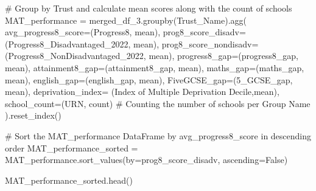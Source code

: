 \documentclass[
  letterpaper,
  DIV=11,
  numbers=noendperiod]{scrartcl}
\newenvironment{Shaded}{\begin{snugshade}}{\end{snugshade}}
\newcommand{\CommentTok}[1]{\textcolor[rgb]{0.37,0.37,0.37}{#1}}
\newcommand{\NormalTok}[1]{\textcolor[rgb]{0.00,0.23,0.31}{#1}}
\newcommand{\OperatorTok}[1]{\textcolor[rgb]{0.37,0.37,0.37}{#1}}
\newcommand{\StringTok}[1]{\textcolor[rgb]{0.13,0.47,0.30}{#1}}
\newcommand{\VariableTok}[1]{\textcolor[rgb]{0.07,0.07,0.07}{#1}}
\begin{document}
\begin{Shaded}
\begin{Highlighting}[]
\CommentTok{\# Group by Trust and calculate mean scores along with the count of schools}
\NormalTok{MAT\_performance }\OperatorTok{=}\NormalTok{ merged\_df\_3.groupby(}\StringTok{\textquotesingle{}Trust\_Name\textquotesingle{}}\NormalTok{).agg(}
\NormalTok{    avg\_progress8\_score}\OperatorTok{=}\NormalTok{(}\StringTok{\textquotesingle{}Progress8\textquotesingle{}}\NormalTok{, }\StringTok{\textquotesingle{}mean\textquotesingle{}}\NormalTok{),}
\NormalTok{    prog8\_score\_disadv}\OperatorTok{=}\NormalTok{(}\StringTok{\textquotesingle{}Progress8\_Disadvantaged\_2022\textquotesingle{}}\NormalTok{, }\StringTok{\textquotesingle{}mean\textquotesingle{}}\NormalTok{),}
\NormalTok{    prog8\_score\_nondisadv}\OperatorTok{=}\NormalTok{(}\StringTok{\textquotesingle{}Progress8\_NonDisadvantaged\_2022\textquotesingle{}}\NormalTok{, }\StringTok{\textquotesingle{}mean\textquotesingle{}}\NormalTok{),}
\NormalTok{    progress8\_gap}\OperatorTok{=}\NormalTok{(}\StringTok{\textquotesingle{}progress8\_gap\textquotesingle{}}\NormalTok{, }\StringTok{\textquotesingle{}mean\textquotesingle{}}\NormalTok{),}
\NormalTok{    attainment8\_gap}\OperatorTok{=}\NormalTok{(}\StringTok{\textquotesingle{}attainment8\_gap\textquotesingle{}}\NormalTok{, }\StringTok{\textquotesingle{}mean\textquotesingle{}}\NormalTok{),}
\NormalTok{    maths\_gap}\OperatorTok{=}\NormalTok{(}\StringTok{\textquotesingle{}maths\_gap\textquotesingle{}}\NormalTok{, }\StringTok{\textquotesingle{}mean\textquotesingle{}}\NormalTok{),}
\NormalTok{    english\_gap}\OperatorTok{=}\NormalTok{(}\StringTok{\textquotesingle{}english\_gap\textquotesingle{}}\NormalTok{, }\StringTok{\textquotesingle{}mean\textquotesingle{}}\NormalTok{),}
\NormalTok{    FiveGCSE\_gap}\OperatorTok{=}\NormalTok{(}\StringTok{\textquotesingle{}5\_GCSE\_gap\textquotesingle{}}\NormalTok{, }\StringTok{\textquotesingle{}mean\textquotesingle{}}\NormalTok{),}
\NormalTok{ deprivation\_index}\OperatorTok{=}\NormalTok{ (}\StringTok{\textquotesingle{}Index of Multiple Deprivation Decile\textquotesingle{}}\NormalTok{,}\StringTok{\textquotesingle{}mean\textquotesingle{}}\NormalTok{),}
\NormalTok{    school\_count}\OperatorTok{=}\NormalTok{(}\StringTok{\textquotesingle{}URN\textquotesingle{}}\NormalTok{, }\StringTok{\textquotesingle{}count\textquotesingle{}}\NormalTok{)  }\CommentTok{\# Counting the number of schools per Group Name}
\NormalTok{).reset\_index()}

\CommentTok{\# Sort the MAT\_performance DataFrame by \textquotesingle{}avg\_progress8\_score\textquotesingle{} in descending order}
\NormalTok{MAT\_performance\_sorted }\OperatorTok{=}\NormalTok{ MAT\_performance.sort\_values(by}\OperatorTok{=}\StringTok{\textquotesingle{}prog8\_score\_disadv\textquotesingle{}}\NormalTok{, ascending}\OperatorTok{=}\VariableTok{False}\NormalTok{)}

\NormalTok{MAT\_performance\_sorted.head()}
\end{Highlighting}
\end{Shaded}
\end{document}
